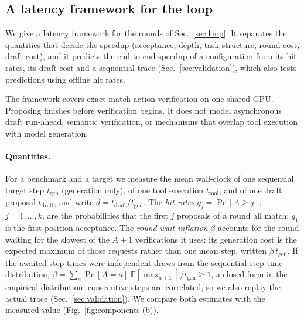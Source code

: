 
\subsection{A latency framework for the loop}
\label{app:detail:model}

We give a latency framework for the rounds of Sec.~\ref{sec:loop}. It
separates the quantities that decide the speedup (acceptance, depth, task
structure, round cost, draft cost), and it predicts the end-to-end speedup of
a configuration from its hit rates, its draft cost and a sequential trace
(Sec.~\ref{sec:validation}), which also tests predictions using offline hit rates.

The framework covers exact-match action verification on one shared GPU. Proposing finishes
before verification begins. It does not model asynchronous draft run-ahead, semantic verification,
or mechanisms that overlap tool execution with model generation.

\paragraph{Quantities.}
For a benchmark and a target we measure the mean wall-clock of one sequential
target step $t_{\mathrm{gen}}$ (generation only), of one tool execution
$t_{\mathrm{tool}}$, and of one draft proposal $t_{\mathrm{draft}}$, and write
$d = t_{\mathrm{draft}}/t_{\mathrm{gen}}$. The \emph{hit rates}
$q_j = \Pr[A \ge j]$, $j = 1,\dots,k$, are the probabilities that the first $j$
proposals of a round all match; $q_1$ is the first-position acceptance. The
\emph{round-wait inflation} $\beta$ accounts for the round waiting for the
slowest of the $A{+}1$ verifications it uses: its generation cost is the
expected maximum of those requests rather than one mean step, written
$\beta\, t_{\mathrm{gen}}$. If the awaited step times were
independent draws from the sequential step-time distribution,
$\beta = \sum_{a} \Pr[A{=}a]\; \mathbb{E}[\max_{a+1}] / t_{\mathrm{gen}} \ge 1$, a
closed form in the empirical distribution; consecutive steps are correlated,
so we also replay the actual trace (Sec.~\ref{sec:validation}). We compare both estimates with the measured value (Fig.~\ref{fig:components}(b)).

